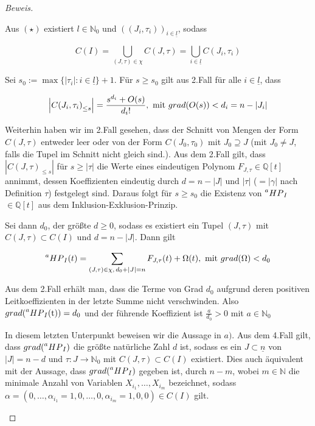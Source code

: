 \documentclass{article}
\newcommand*{\indx}[2]{{#1}_{#2}}
\newcommand*{\N}{\mathbb{N}_0}
\newcommand*{\hp}[1]{$\prescript{a}{}{HP}_{#1}$}
\begin{document}
\begin{proof}[Beweis]
\begin{compactenum}
Aus $(\star)$ existiert $l\in\N$ und $\indx{\left((\indx{J}{i},\indx{\tau}{i})\right)}{i\in\underline{l}}$, sodass

\begin{displaymath}
C(I)=\bigcup\limits_{(J,\tau)\in \chi}C(J,\tau)=\bigcup\limits_{i\in\underline{l}}C(\indx{J}{i},\indx{\tau}{i})
\end{displaymath}

Sei $\indx{s}{0}:=\max{\{|\indx{\tau}{i}|:i\in\underline{l}\}}+1$. Für $s\geq \indx{s}{0}$ gilt  aus 2.Fall für alle $i\in \underline{l}$, dass

\begin{displaymath}
\left|\indx{C(\indx{J}{i},\indx{\tau}{i})}{\leq s}\right|=\frac{s^{\indx{d}{i}}+O(s)}{\indx{d}{i}!}, \textnormal{ mit }grad(O(s))<{\indx{d}{i}}=n-|\indx{J}{i}|
\end{displaymath}

Weiterhin haben wir im 2.Fall gesehen, dass der Schnitt von Mengen der Form $C(J,\tau)$ entweder leer oder von der Form $C(\indx{J}{0},\indx{\tau}{0})$ mit $\indx{J}{0}\supseteq J$ (mit $\indx{J}{0}\neq J$, falls die Tupel im Schnitt nicht gleich sind.). Aus dem 2.Fall gilt, dass $\left|\indx{C(J,\tau)}{\leq s}\right|$ für $s\geq |\tau|$ die Werte eines eindeutigen Polynom $\indx{F}{J,\tau}\in \mathbb{Q}[t]$ annimmt, dessen Koeffizienten eindeutig durch $d=n-|J|$ und $|\tau|$ ($=|\gamma| $ nach Definition $\tau$) festgelegt sind. Daraus folgt für $s\geq\indx{s}{0}$ die Existenz von \hp{I} $\in \mathbb{Q}[t]$ aus dem Inklusion-Exklusion-Prinzip.


Sei dann $\indx{d}{0}$, der größte $d\geq0$, sodass es existiert ein Tupel $(J,\tau)$ mit $C(J,\tau)\subset C(I)$ und $d=n-|J|$. Dann gilt

\begin{displaymath}
\textnormal{\hp{I}}(t)=\sum\limits_{(J,\tau)\in \chi,\, \indx{d}{0}+|J|=n}{\indx{F}{J,\tau}(t)} +\Omega(t), \textnormal{ mit } grad(\Omega)<\indx{d}{0}\\
\end{displaymath}

Aus dem 2.Fall erhält man, dass die Terme von Grad $\indx{d}{0}$ aufgrund deren positiven Leitkoeffizienten in der letzte Summe nicht verschwinden. Also $grad(\textnormal{\hp{I}(t)})=\indx{d}{0}$ und der führende Koeffizient ist $\frac{a}{\indx{d}{0}}>0$ mit $a\in\N$\\

\item In diesem letzten Unterpunkt beweisen wir die Aussage in $a)$. Aus dem 4.Fall gilt, dass $grad(\textnormal{\hp{I}})$ die größte natürliche Zahl $d$ ist, sodass es ein $J\subset\underline{n}$ von $|J|=n-d$ und $\tau: J\rightarrow\N$ mit $C(J,\tau)\subset C(I)$  existiert. Dies auch äquivalent mit der Aussage, dass $grad(\textnormal{\hp{I}})$ gegeben ist, durch $n-m$, wobei $m\in\mathbb{N}$ die minimale Anzahl von Variablen $\indx{X}{\indx{i}{1}},\ldots,\indx{X}{\indx{i}{m}}$ bezeichnet, sodass\\ $\alpha=(0,\ldots,\indx{\alpha}{\indx{i}{1}}=1,0,\ldots,0,\indx{\alpha}{\indx{i}{m}}=1,0,0)\in C(I)$ gilt.\\


\end{compactenum}
\end{proof}
\end{document}
